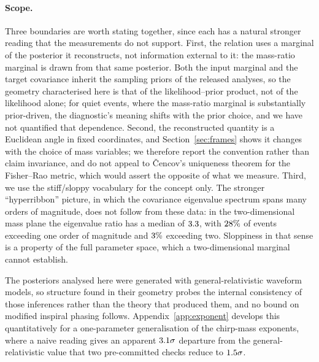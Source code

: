 \documentclass[aps,prd,twocolumn,amsmath,amssymb,nofootinbib,superscriptaddress]{revtex4-2}
\begin{document}
\paragraph{Scope.} Three boundaries are worth stating together, since each has a natural stronger reading
that the measurements do not support. First, the relation uses a marginal of the posterior it
reconstructs, not information external to it: the mass-ratio marginal is drawn from that same posterior.
Both the input marginal and the target covariance inherit the sampling priors of the released analyses, so
the geometry characterised here is that of the likelihood--prior product, not of the likelihood alone; for
quiet events, where the mass-ratio marginal is substantially prior-driven, the diagnostic's meaning shifts
with the prior choice, and we have not quantified that dependence.
Second, the reconstructed quantity is a Euclidean angle in fixed coordinates, and Section~\ref{sec:frames}
shows it changes with the choice of mass variables; we therefore report the convention rather than claim
invariance, and do not appeal to {\v C}encov's uniqueness theorem for the Fisher--Rao metric, which would
assert the opposite of what we measure. Third, we use the stiff/sloppy vocabulary
\citep{Transtrum2015} for the concept only. The stronger ``hyperribbon'' picture, in which the covariance
eigenvalue spectrum spans many orders of magnitude, does not follow from these data: in the
two-dimensional mass plane the eigenvalue ratio has a median of $3.3$, with $28\%$
of events exceeding one order of magnitude and $3\%$ exceeding two. Sloppiness in that sense is
a property of the full parameter space, which a two-dimensional marginal cannot establish.

The posteriors analysed here were generated with general-relativistic waveform models, so structure found
in their geometry probes the internal consistency of those inferences rather than the theory that produced
them, and no bound on modified inspiral phasing follows. Appendix~\ref{app:exponent} develops this
quantitatively for a one-parameter generalisation of the chirp-mass exponents, where a naive reading gives
an apparent $3.1\sigma$ departure from the general-relativistic value that two pre-committed
checks reduce to $1.5\sigma$.
\end{document}
